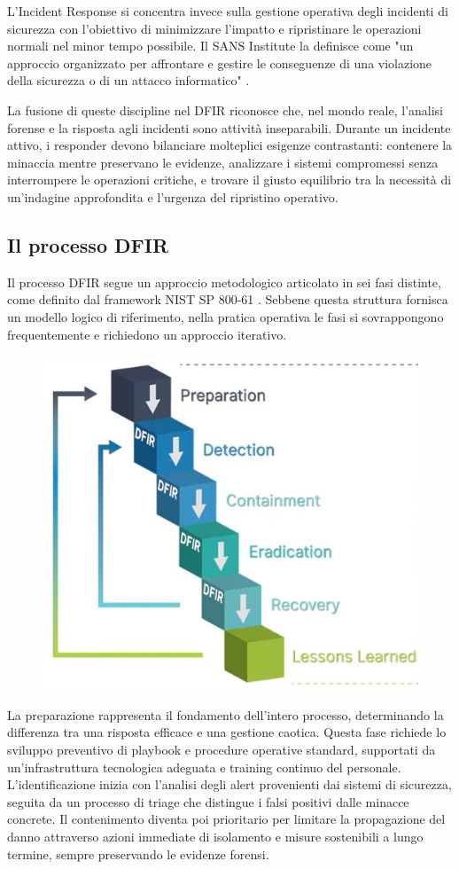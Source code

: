 L'Incident Response si concentra invece sulla gestione operativa degli incidenti di sicurezza con l'obiettivo di minimizzare l'impatto e ripristinare le operazioni normali nel minor tempo possibile. Il SANS Institute la definisce come "un approccio organizzato per affrontare e gestire le conseguenze di una violazione della sicurezza o di un attacco informatico" \cite{sans2023}.

La fusione di queste discipline nel DFIR riconosce che, nel mondo reale, l'analisi forense e la risposta agli incidenti sono attività inseparabili. Durante un incidente attivo, i responder devono bilanciare molteplici esigenze contrastanti: contenere la minaccia mentre preservano le evidenze, analizzare i sistemi compromessi senza interrompere le operazioni critiche, e trovare il giusto equilibrio tra la necessità di un'indagine approfondita e l'urgenza del ripristino operativo.

\subsection{Il processo DFIR}

Il processo DFIR segue un approccio metodologico articolato in sei fasi distinte, come definito dal framework NIST SP 800-61 \cite{cichonski2012}. Sebbene questa struttura fornisca un modello logico di riferimento, nella pratica operativa le fasi si sovrappongono frequentemente e richiedono un approccio iterativo.

\begin{figure}[H]
    \centering
    \includegraphics[width=0.6\linewidth]{images/stato-arte/digital-forensics-incident-response-plan-flow.png}
\end{figure}

La preparazione rappresenta il fondamento dell'intero processo, determinando la differenza tra una risposta efficace e una gestione caotica. Questa fase richiede lo sviluppo preventivo di playbook e procedure operative standard, supportati da un'infrastruttura tecnologica adeguata e training continuo del personale. L'identificazione inizia con l'analisi degli alert provenienti dai sistemi di sicurezza, seguita da un processo di triage che distingue i falsi positivi dalle minacce concrete. Il contenimento diventa poi prioritario per limitare la propagazione del danno attraverso azioni immediate di isolamento e misure sostenibili a lungo termine, sempre preservando le evidenze forensi.

